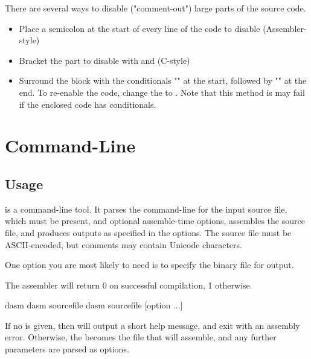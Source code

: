 There are several ways to disable ("comment-out") large parts of the source code.

\begin{itemize}
\item Place a semicolon at the start of every line of the code to disable (Assembler-style)
\item Bracket the part to disable with \mono{/*} and \mono{*/}  (C-style)
\item Surround the block with the conditionals "" at the start, followed by "" at the end. To re-enable the code, change the  to . Note that this method is may fail if the enclosed code has conditionals.
\end{itemize}



\chapter{Command-Line}






\section{Usage}
\dasm is a command-line tool. It parses the command-line for the input source file, which must be present, and optional assemble-time options, assembles the source file, and produces outputs as specified in the options. The source file must be ASCII-encoded, but comments may contain Unicode characters.

One option you are most likely to need is  to specify the binary file for output.

The assembler will return 0 on successful compilation, 1 otherwise.

\begin{usage}
dasm
dasm sourcefile
dasm sourcefile [option ...]
\end{usage}

\label{changelog:20200824sourcefile}
If no  is given, then \dasm will output a short help message, and exit with an assembly error. Otherwise, the  becomes the file that \dasm will assemble, and any further parameters are parsed as options.


